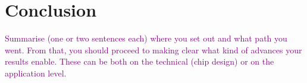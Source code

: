 \chapter{Conclusion}
\textcolor{purple}{Summarise (one or two sentences each) where you set out and what path you went. From that, you should proceed to making clear what kind of advances your results enable. These can be both on the technical (chip design) or on the application level.}
